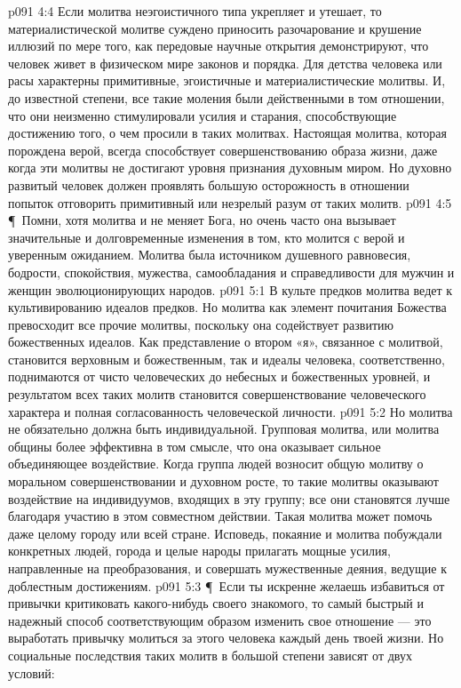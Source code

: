 \vs p091 4:4 Если молитва неэгоистичного типа укрепляет и утешает, то материалистической молитве суждено приносить разочарование и крушение иллюзий по мере того, как передовые научные открытия демонстрируют, что человек живет в физическом мире законов и порядка. Для детства человека или расы характерны примитивные, эгоистичные и материалистические молитвы. И, до известной степени, все такие моления были действенными в том отношении, что они неизменно стимулировали усилия и старания, способствующие достижению того, о чем просили в таких молитвах. Настоящая молитва, которая порождена верой, всегда способствует совершенствованию образа жизни, даже когда эти молитвы не достигают уровня признания духовным миром. Но духовно развитый человек должен проявлять большую осторожность в отношении попыток отговорить примитивный или незрелый разум от таких молитв.
\vs p091 4:5 \P\ Помни, хотя молитва и не меняет Бога, но очень часто она вызывает значительные и долговременные изменения в том, кто молится с верой и уверенным ожиданием. Молитва была источником душевного равновесия, бодрости, спокойствия, мужества, самообладания и справедливости для мужчин и женщин эволюционирующих народов.
\vs p091 5:1 В культе предков молитва ведет к культивированию идеалов предков. Но молитва как элемент почитания Божества превосходит все прочие молитвы, поскольку она содействует развитию божественных идеалов. Как представление о втором «я», связанное с молитвой, становится верховным и божественным, так и идеалы человека, соответственно, поднимаются от чисто человеческих до небесных и божественных уровней, и результатом всех таких молитв становится совершенствование человеческого характера и полная согласованность человеческой личности.
\vs p091 5:2 Но молитва не обязательно должна быть индивидуальной. Групповая молитва, или молитва общины более эффективна в том смысле, что она оказывает сильное объединяющее воздействие. Когда группа людей возносит общую молитву о моральном совершенствовании и духовном росте, то такие молитвы оказывают воздействие на индивидуумов, входящих в эту группу; все они становятся лучше благодаря участию в этом совместном действии. Такая молитва может помочь даже целому городу или всей стране. Исповедь, покаяние и молитва побуждали конкретных людей, города и целые народы прилагать мощные усилия, направленные на преобразования, и совершать мужественные деяния, ведущие к доблестным достижениям.
\vs p091 5:3 \P\ Если ты искренне желаешь избавиться от привычки критиковать какого\hyp{}нибудь своего знакомого, то самый быстрый и надежный способ соответствующим образом изменить свое отношение --- это выработать привычку молиться за этого человека каждый день твоей жизни. Но социальные последствия таких молитв в большой степени зависят от двух условий:
